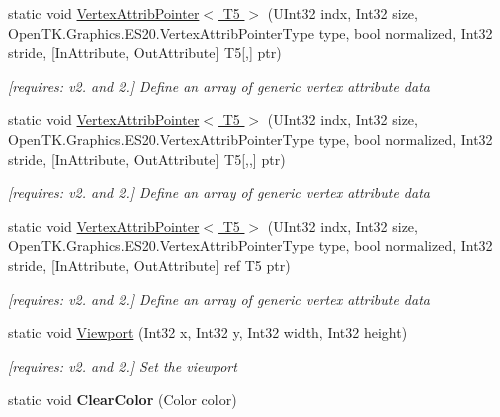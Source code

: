 \begin{DoxyCompactItemize}
static void \hyperlink{class_open_t_k_1_1_graphics_1_1_e_s20_1_1_g_l_a6984f62e29f3bf1595378131c88dda55}{Vertex\-Attrib\-Pointer$<$ T5 $>$} (U\-Int32 indx, Int32 size, Open\-T\-K.\-Graphics.\-E\-S20.\-Vertex\-Attrib\-Pointer\-Type type, bool normalized, Int32 stride, \mbox{[}In\-Attribute, Out\-Attribute\mbox{]} T5\mbox{[},\mbox{]} ptr)
\begin{DoxyCompactList}\small\item\em \mbox{[}requires\-: v2. and 2.\mbox{]} Define an array of generic vertex attribute data \end{DoxyCompactList}\item 
static void \hyperlink{class_open_t_k_1_1_graphics_1_1_e_s20_1_1_g_l_a0b9294b9432e96186779cbfc52530042}{Vertex\-Attrib\-Pointer$<$ T5 $>$} (U\-Int32 indx, Int32 size, Open\-T\-K.\-Graphics.\-E\-S20.\-Vertex\-Attrib\-Pointer\-Type type, bool normalized, Int32 stride, \mbox{[}In\-Attribute, Out\-Attribute\mbox{]} T5\mbox{[},,\mbox{]} ptr)
\begin{DoxyCompactList}\small\item\em \mbox{[}requires\-: v2. and 2.\mbox{]} Define an array of generic vertex attribute data \end{DoxyCompactList}\item 
static void \hyperlink{class_open_t_k_1_1_graphics_1_1_e_s20_1_1_g_l_a7df2685979eaa8497f981807387b70c4}{Vertex\-Attrib\-Pointer$<$ T5 $>$} (U\-Int32 indx, Int32 size, Open\-T\-K.\-Graphics.\-E\-S20.\-Vertex\-Attrib\-Pointer\-Type type, bool normalized, Int32 stride, \mbox{[}In\-Attribute, Out\-Attribute\mbox{]} ref T5 ptr)
\begin{DoxyCompactList}\small\item\em \mbox{[}requires\-: v2. and 2.\mbox{]} Define an array of generic vertex attribute data \end{DoxyCompactList}\item 
static void \hyperlink{class_open_t_k_1_1_graphics_1_1_e_s20_1_1_g_l_a2994111286955864d5c6fd37d142fc14}{Viewport} (Int32 x, Int32 y, Int32 width, Int32 height)
\begin{DoxyCompactList}\small\item\em \mbox{[}requires\-: v2. and 2.\mbox{]} Set the viewport \end{DoxyCompactList}\item 
\hypertarget{class_open_t_k_1_1_graphics_1_1_e_s20_1_1_g_l_a1f6269cb9cd7c1ba25935733a396335f}{static void {\bfseries Clear\-Color} (Color color)}\label{class_open_t_k_1_1_graphics_1_1_e_s20_1_1_g_l_a1f6269cb9cd7c1ba25935733a396335f}


\end{DoxyCompactItemize}
